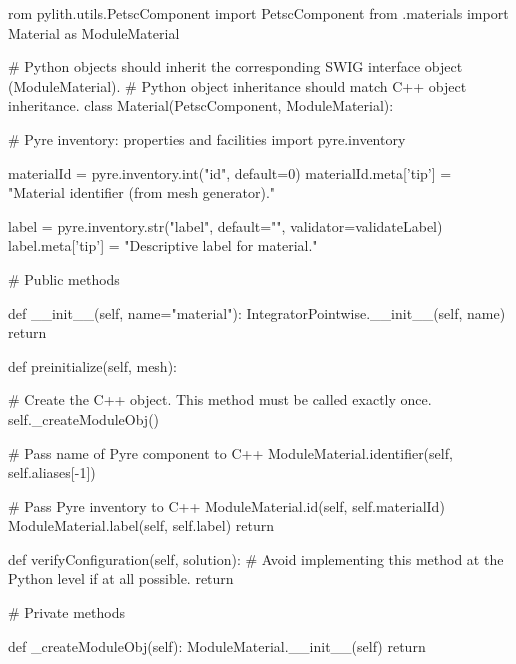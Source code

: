 \begin{python}
rom pylith.utils.PetscComponent import PetscComponent
from .materials import Material as ModuleMaterial

# Python objects should inherit the corresponding SWIG interface object (ModuleMaterial).
# Python object inheritance should match C++ object inheritance.
class Material(PetscComponent, ModuleMaterial):

    # Pyre inventory: properties and facilities
    import pyre.inventory

    materialId = pyre.inventory.int("id", default=0)
    materialId.meta['tip'] = "Material identifier (from mesh generator)."

    label = pyre.inventory.str("label", default="", validator=validateLabel)
    label.meta['tip'] = "Descriptive label for material."


    # Public methods

    def __init__(self, name="material"):
        IntegratorPointwise.__init__(self, name)
        return

    def preinitialize(self, mesh):

        # Create the C++ object. This method must be called exactly once.
        self._createModuleObj()

        # Pass name of Pyre component to C++
        ModuleMaterial.identifier(self, self.aliases[-1])

        # Pass Pyre inventory to C++
        ModuleMaterial.id(self, self.materialId)
        ModuleMaterial.label(self, self.label)
        return

    def verifyConfiguration(self, solution):
        # Avoid implementing this method at the Python level if at all possible.
        return


    # Private methods

    def _createModuleObj(self):
        ModuleMaterial.__init__(self)
        return

\end{python}

